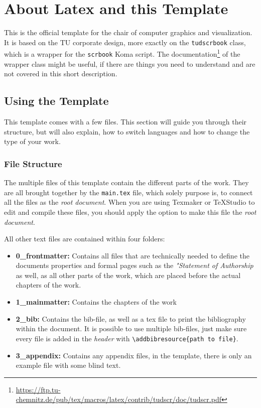 \setcounter{chapter}{-1} %
\chapter{About Latex and this Template}

This is the official template for the chair of computer graphics and visualization.  It is based on the TU corporate design, more exactly on the \texttt{tudscrbook} class, which is a wrapper for the \texttt{scrbook} Koma script. The documentation\footnote{\href{https://ftp.tu-chemnitz.de/pub/tex/macros/latex/contrib/tudscr/doc/tudscr.pdf}{https://ftp.tu-chemnitz.de/pub/tex/macros/latex/contrib/tudscr/doc/tudscr.pdf}} of the wrapper class might be useful, if there are things you need to understand and are not covered in this short description.

\section{Using the Template}
This template comes with a few files. This section will guide you through their structure, but will also explain, how to switch languages and how to change the type of your work.

\subsection{File Structure}
The multiple files of this template contain the different parts of the work. They are all brought together by the \texttt{main.tex} file, which solely purpose is, to connect all the files as the \emph{root document}. When you are using Texmaker or TeXStudio to edit and compile these files, you should apply the option to make this file the \emph{root document}.

All other text files are contained within four folders:
\vspace{-\topsep} %
\begin{itemize}
	\item \textbf{0\_frontmatter:} Contains all files that are technically needed to define the documents properties and formal pages such as the \emph{"Statement of Authorship} as well, as all other parts of the work, which are placed before the actual chapters of the work.
	\item \textbf{1\_mainmatter:} Contains the chapters of the work
	\item \textbf{2\_bib:} Contains the bib-file, as well as a tex file to print the bibliography within the document. It is possible to use multiple bib-files, just make sure every file is added in the \emph{header} with \texttt{\textbackslash addbibresource\{path to file\}}.
	\item  \textbf{3\_appendix:} Contains any appendix files, in the template, there is only an example file with some blind text.
\end{itemize}

